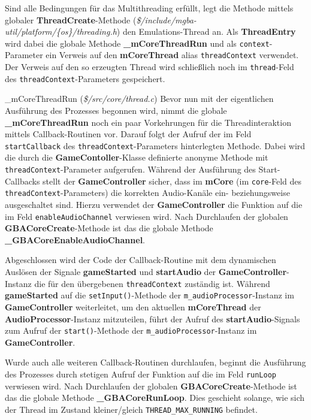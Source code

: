 \documentclass[11pt,a4paper]{scrartcl}
\begin{document}
Sind alle Bedingungen f\"ur das Multithreading erf\"ullt, legt die Methode mittels globaler \textbf{ThreadCreate}-Methode (\textit{\$/include/mgba-util/platform/\{os\}/threading.h}) den Emulations-Thread an. Als \textbf{ThreadEntry} wird dabei die globale Methode \textbf{{\_}mCoreThreadRun} und als \verb|context|-Parameter ein Verweis auf den \textbf{mCoreThread} alias \verb|threadContext| verwendet. Der Verweis auf den so erzeugten Thread wird schlie{\ss}lich noch im \verb|thread|-Feld des \verb|threadContext|-Parameters gespeichert.

\vspace{5mm}
\large {\_}mCoreThreadRun \normalsize(\textit{\$/src/core/thread.c})
\vspace{2mm}\newline
Bevor nun mit der eigentlichen Ausf\"uhrung des Prozesses begonnen wird, nimmt die globale \textbf{{\_}mCoreThreadRun} noch ein paar Vorkehrungen f\"ur die Threadinteraktion mittels Callback-Routinen vor. Darauf folgt der Aufruf der im Feld \verb|startCallback| des \verb|threadContext|-Parameters hinterlegten Methode. Dabei wird die durch die \textbf{GameContoller}-Klasse definierte anonyme Methode mit \verb|threadContext|-Parameter aufgerufen. W\"ahrend der Ausf\"uhrung des Start-Callbacks stellt der \textbf{GameController} sicher, dass im \textbf{mCore} (im \verb|core|-Feld des \verb|threadContext|-Parameters) die korrekten Audio-Kan\"ale ein- beziehungsweise ausgeschaltet sind. Hierzu verwendet der \textbf{GameController} die Funktion auf die im Feld \verb|enableAudioChannel| verwiesen wird. Nach Durchlaufen der globalen \textbf{GBACoreCreate}-Methode ist das die globale Methode \textbf{{\_}GBACoreEnableAudioChannel}.

Abgeschlossen wird der Code der Callback-Routine mit dem dynamischen Ausl\"osen der Signale \textbf{gameStarted} und \textbf{startAudio} der \textbf{GameController}-Instanz die f\"ur den \"ubergebenen \verb|threadContext| zust\"andig ist. W\"ahrend \textbf{gameStarted} auf die \verb|setInput()|-Methode der \verb|m_audioProcessor|-Instanz im \textbf{GameController} weiterleitet, um den aktuellen \textbf{mCoreThread} der \textbf{AudioProcessor}-Instanz mitzuteilen, f\"uhrt der Aufruf des \textbf{startAudio}-Signals zum Aufruf der \verb|start()|-Methode der \verb|m_audioProcessor|-Instanz im \textbf{GameController}.

Wurde auch alle weiteren Callback-Routinen durchlaufen, beginnt die Ausf\"uhrung des Prozesses durch stetigen Aufruf der Funktion auf die im Feld \verb|runLoop| verwiesen wird. Nach Durchlaufen der globalen \textbf{GBACoreCreate}-Methode ist das die globale Methode \textbf{{\_}GBACoreRunLoop}. Dies geschieht solange, wie sich der Thread im Zustand kleiner/gleich \verb|THREAD_MAX_RUNNING| befindet.
\end{document}

